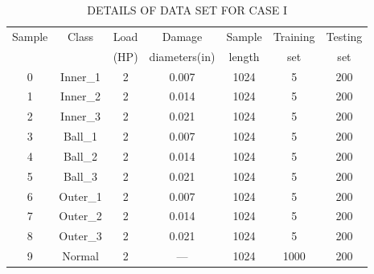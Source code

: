 \begin{table}[htbp]
\centering
\caption{DETAILS OF DATA SET FOR CASE I}
\label{tab:dataset_caseI}
\begin{tabular}{ccccccc}
\toprule
Sample & Class & Load & Damage & Sample & Training & Testing \\
 & & (HP) & diameters(in) & length & set & set \\
\midrule
0 & Inner\_1 & 2 & 0.007 & 1024 & 5 & 200 \\
1 & Inner\_2 & 2 & 0.014 & 1024 & 5 & 200 \\
2 & Inner\_3 & 2 & 0.021 & 1024 & 5 & 200 \\
3 & Ball\_1 & 2 & 0.007 & 1024 & 5 & 200 \\
4 & Ball\_2 & 2 & 0.014 & 1024 & 5 & 200 \\
5 & Ball\_3 & 2 & 0.021 & 1024 & 5 & 200 \\
6 & Outer\_1 & 2 & 0.007 & 1024 & 5 & 200 \\
7 & Outer\_2 & 2 & 0.014 & 1024 & 5 & 200 \\
8 & Outer\_3 & 2 & 0.021 & 1024 & 5 & 200 \\
9 & Normal & 2 & --- & 1024 & 1000 & 200 \\
\bottomrule
\end{tabular}
\end{table}
